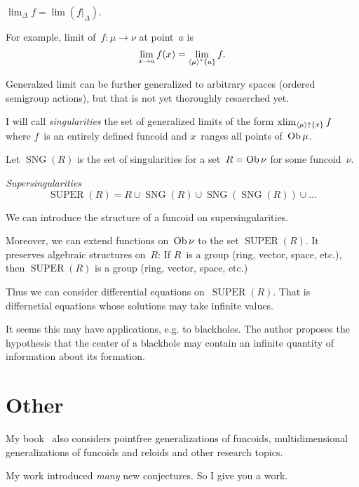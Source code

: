 \documentclass{amsart}
\begin{document}
\begin{defn}
$\lim_{\Delta} f=\lim(f|_{\Delta})$.
\end{defn}

For example, limit of~$f:\mu\to\nu$ at point~$a$ is
\[ \lim_{x\to a}f(x) = \lim_{\left\langle \mu\right\rangle ^{\ast}\{a\}}f. \]

Generalzed limit can be further generalized to arbitrary spaces
(ordered semigroup actions), but that is not yet thoroughly resaerched yet.

I will call \emph{singularities} the set of generalized limits of the form $\operatorname{xlim}_{\left\langle \mu\right\rangle\uparrow\{x\}}f$ where $f$~is an entirely defined funcoid and $x$~ranges all points of~$\operatorname{Ob}\mu$.

Let $\operatorname{SNG}(R)$ is the set of singularities for
a set~$R=\operatorname{Ob}\nu$ for some funcoid~$\nu$.

\begin{defn}
\emph{Supersingularities}
\[
\operatorname{SUPER}(R) =
R\cup\operatorname{SNG}(R)\cup
\operatorname{SNG}(\operatorname{SNG}(R))\cup\dots
\]
\end{defn}

We can introduce the structure of a funcoid on supersingularities.

Moreover, we can extend functions on~$\operatorname{Ob}\nu$ to the set
$\operatorname{SUPER}(R)$. It preserves algebraic structures
on~$R$: If $R$~is a group (ring, vector, space, etc.), then $\operatorname{SUPER}(R)$ is a group (ring, vector, space, etc.)

Thus we can consider differential equations
on~$\operatorname{SUPER}(R)$. That is differnetial equations
whose solutions may take infinite values.

It seems this may have applications, e.g. to blackholes.
The author proposes the hypothesis that the center of a blackhole
may contain an infinite quantity of information about its
formation.

\section{Other}

My book~\cite{volume-1-edition1} also considers pointfree generalizations of funcoids,
multidimensional generalizations of funcoids and reloids and other research topics.

My work introduced \emph{many} new conjectures. So I give you a work.



\end{document}
